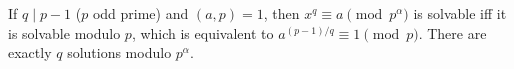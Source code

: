 If $q \mid p-1$ ($p$ odd prime) and $(a,p)=1$, then $x^q \equiv a \pmod{p^\alpha}$ is solvable iff it is solvable modulo $p$, which is equivalent to $a^{(p-1)/q} \equiv 1 \pmod{p}$. There are exactly $q$ solutions modulo $p^\alpha$.

